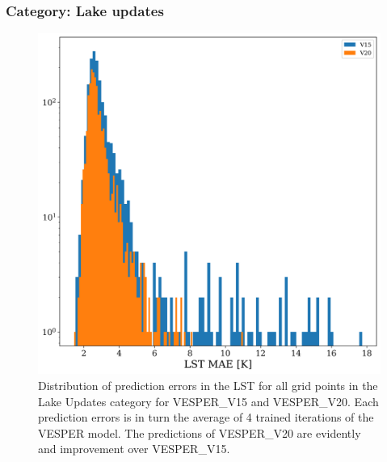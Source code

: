\documentclass[hess, twostagejnl]{copernicus}
\begin{document}
\subsubsection{Category: Lake updates}
\begin{figure}
	\includegraphics[width=\columnwidth]{lakes_histogram_plot}
	\caption{Distribution of prediction errors in the LST for all grid points in the Lake Updates category for VESPER\_V15 and VESPER\_V20.  Each prediction errors is in turn the average of 4 trained iterations of the VESPER model. The predictions of VESPER\_V20 are evidently and improvement over VESPER\_V15.} 
	\label{fig:example_figure_histogram}
\end{figure}
\end{document}
